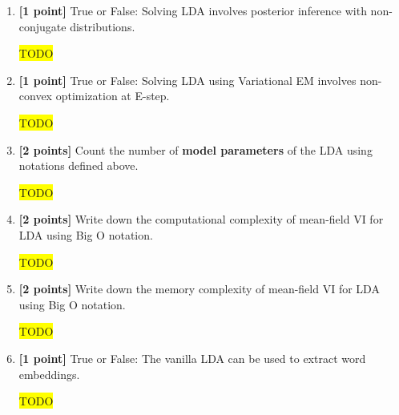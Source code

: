 \documentclass[10pt]{article}
\newcommand{\hilight}[1]{\colorbox{yellow}{#1}}
\begin{document}
\begin{enumerate}
    \item \textbf{[1 point]} True or False: Solving LDA involves posterior inference with non-conjugate distributions.

\begin{solution}
\hilight{TODO}
\end{solution}

    \item \textbf{[1 point]} True or False: Solving LDA using Variational EM involves non-convex optimization at E-step.

\begin{solution}
\hilight{TODO}
\end{solution}

    \item \textbf{[2 points]} Count the number of \textbf{model parameters} of the LDA using notations defined above.

\begin{solution}
\hilight{TODO}
\end{solution}

    \item \textbf{[2 points]} Write down the computational complexity of mean-field VI for LDA using Big O notation.

\begin{solution}
\hilight{TODO}
\end{solution}

    \item \textbf{[2 points]} Write down the memory complexity of mean-field VI for LDA using Big O notation.

\begin{solution}
\hilight{TODO}
\end{solution}

    \item \textbf{[1 point]} True or False: The vanilla LDA can be used to extract word embeddings.

\begin{solution}
\hilight{TODO}
\end{solution}

\end{enumerate}
\end{document}
